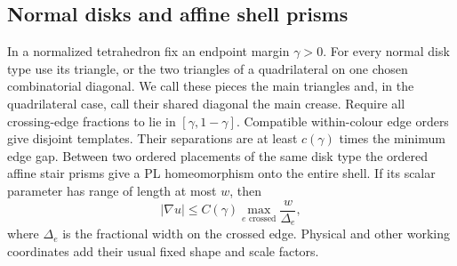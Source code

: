 \subsection{Normal disks and affine shell prisms}

\begin{lemma}
\label{ms:normal-templates}
In a normalized tetrahedron fix an endpoint margin $\gamma>0$.
For every normal disk type use its triangle, or the two triangles
of a quadrilateral on one chosen combinatorial diagonal.  We call these
pieces the main triangles and, in the quadrilateral case, call their
shared diagonal the main crease.  Require all crossing-edge fractions
to lie in $[\gamma,1-\gamma]$.
Compatible within-colour edge orders give disjoint templates.
Their separations are at least $c(\gamma)$ times the minimum edge
gap.  Between two ordered placements of the same disk type the
ordered affine stair prisms give a PL homeomorphism onto the entire
shell.  If its scalar parameter has range of length at most $w$,
then
\begin{equation}
 |\nabla u|\le C(\gamma)
       \max_{e\text{ crossed}}\frac{w}{\Delta_e},
 \label{ms:normal-slope}
\end{equation}
where $\Delta_e$ is the fractional width on the crossed edge.
Physical and other working coordinates add their usual fixed shape
and scale factors.
\end{lemma}


